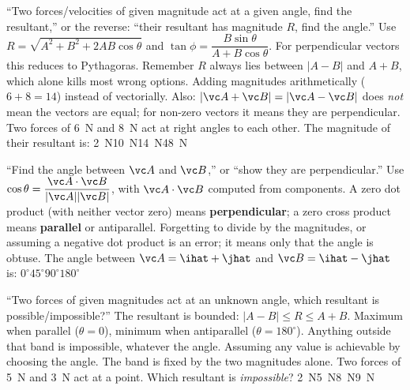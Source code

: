 {``Two forces/velocities of given magnitude act at a given angle, find the resultant,'' or the reverse:
``their resultant has magnitude $R$, find the angle.''}
{Use $R=\sqrt{A^2+B^2+2AB\cos\theta}$ and $\tan\phi=\dfrac{B\sin\theta}{A+B\cos\theta}$. For
perpendicular vectors this reduces to Pythagoras. Remember $R$ always lies between $|A-B|$ and $A+B$, which
alone kills most wrong options.}
{Adding magnitudes arithmetically ($6+8=14$) instead of vectorially. Also: $|\vc A+\vc B|=|\vc A-\vc B|$
does \emph{not} mean the vectors are equal; for non-zero vectors it means they are perpendicular.}
{Two forces of \SI{6}{N} and \SI{8}{N} act at right angles to each other. The magnitude of their
resultant is:}
{\SI{2}{N}}{\SI{10}{N}}{\SI{14}{N}}{\SI{48}{N}}

{``Find the angle between $\vc A$ and $\vc B$,'' or ``show they are perpendicular.''}
{Use $\cos\theta=\dfrac{\vc A\cdot\vc B}{|\vc A||\vc B|}$, with $\vc A\cdot\vc B$ computed from
components. A zero dot product (with neither vector zero) means \textbf{perpendicular}; a zero cross
product means \textbf{parallel} or antiparallel.}
{Forgetting to divide by the magnitudes, or assuming a negative dot product is an error; it
means only that the angle is obtuse.}
{The angle between $\vc A=\ihat+\jhat$ and $\vc B=\ihat-\jhat$ is:}
{$0^\circ$}{$45^\circ$}{$90^\circ$}{$180^\circ$}

{``Two forces of given magnitudes act at an unknown angle, which resultant is possible/impossible?''}
{The resultant is bounded: $|A-B|\le R\le A+B$. Maximum when parallel ($\theta=0$), minimum when
antiparallel ($\theta=180^\circ$). Anything outside that band is impossible, whatever the angle.}
{Assuming any value is achievable by choosing the angle. The band is fixed by the two magnitudes alone.}
{Two forces of \SI{5}{N} and \SI{3}{N} act at a point. Which resultant is \emph{impossible}?}
{\SI{2}{N}}{\SI{5}{N}}{\SI{8}{N}}{\SI{9}{N}}

